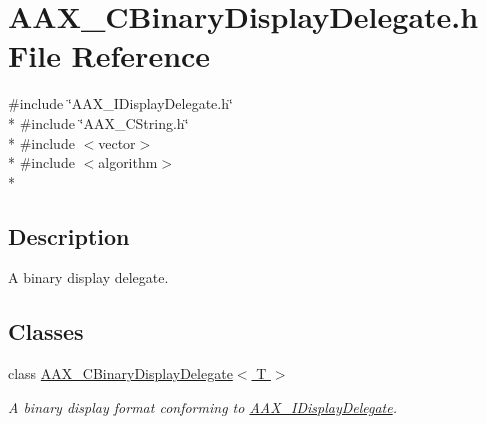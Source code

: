 \hypertarget{a00166}{}\section{A\+A\+X\+\_\+\+C\+Binary\+Display\+Delegate.\+h File Reference}
\label{a00166}
{\ttfamily \#include \char`\"{}A\+A\+X\+\_\+\+I\+Display\+Delegate.\+h\char`\"{}}\\*
{\ttfamily \#include \char`\"{}A\+A\+X\+\_\+\+C\+String.\+h\char`\"{}}\\*
{\ttfamily \#include $<$vector$>$}\\*
{\ttfamily \#include $<$algorithm$>$}\\*


\subsection{Description}
A binary display delegate. 

\subsection*{Classes}
\begin{DoxyCompactItemize}
\item 
class \hyperlink{a00012}{A\+A\+X\+\_\+\+C\+Binary\+Display\+Delegate$<$ T $>$}
\begin{DoxyCompactList}\small\item\em A binary display format conforming to \hyperlink{a00092}{A\+A\+X\+\_\+\+I\+Display\+Delegate}. \end{DoxyCompactList}\end{DoxyCompactItemize}
